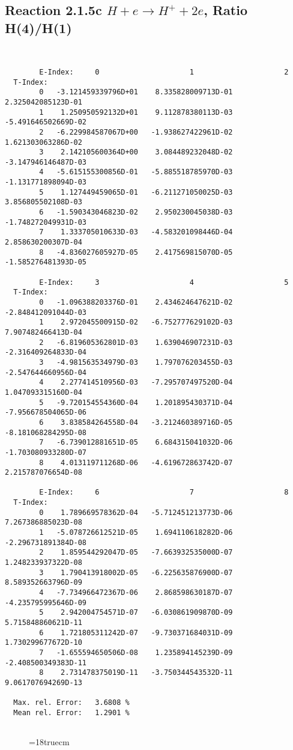 \newpage
\subsection{
Reaction 2.1.5c  $H + e \rightarrow H^+ + 2e$, Ratio H(4)/H(1)
}


\begin{verbatim}


        E-Index:     0                     1                     2
  T-Index:
        0   -3.121459339796D+01    8.335828009713D-01    2.325042085123D-01
        1    1.250950592132D+01    9.112878380113D-03   -5.491646502669D-02
        2   -6.229984587067D+00   -1.938627422961D-02    1.621303063286D-02
        3    2.142105600364D+00    3.084489232048D-02   -3.147946146487D-03
        4   -5.615155300856D-01   -5.885518785970D-03   -1.131771898094D-03
        5    1.127449459065D-01   -6.211271050025D-03    3.856805502108D-03
        6   -1.590343046823D-02    2.950230045038D-03   -1.748272049931D-03
        7    1.333705010633D-03   -4.583201098446D-04    2.858630200307D-04
        8   -4.836027605927D-05    2.417569815070D-05   -1.585276481393D-05

        E-Index:     3                     4                     5
  T-Index:
        0   -1.096388203376D-01    2.434624647621D-02   -2.848412091044D-03
        1    2.972045500915D-02   -6.752777629102D-03    7.907482466413D-04
        2   -6.819605362801D-03    1.639046907231D-03   -2.316409264833D-04
        3   -4.981563534979D-03    1.797076203455D-03   -2.547644660956D-04
        4    2.277414510956D-03   -7.295707497520D-04    1.047093315160D-04
        5   -9.720154554360D-04    1.201895430371D-04   -7.956678504065D-06
        6    3.838584264558D-04   -3.212460389716D-05   -8.181068284295D-08
        7   -6.739012881651D-05    6.684315041032D-06   -1.703080933280D-07
        8    4.013119711268D-06   -4.619672863742D-07    2.215787076654D-08

        E-Index:     6                     7                     8
  T-Index:
        0    1.789669578362D-04   -5.712451213773D-06    7.267386885023D-08
        1   -5.078726612521D-05    1.694110618282D-06   -2.296731891384D-08
        2    1.859544292047D-05   -7.663932535000D-07    1.248233937322D-08
        3    1.790413918002D-05   -6.225635876900D-07    8.589352663796D-09
        4   -7.734966472367D-06    2.868598630187D-07   -4.235795995646D-09
        5    2.942004754571D-07   -6.030861909870D-09    5.715848860621D-11
        6    1.721805311242D-07   -9.730371684031D-09    1.730299677672D-10
        7   -1.655594650506D-08    1.235894145239D-09   -2.408500349383D-11
        8    2.731478375019D-11   -3.750344543532D-11    9.061707694269D-13

  Max. rel. Error:   3.6808 %
  Mean rel. Error:   1.2901 %


\end{verbatim}
\begin{figure} \label{2.1.5c}
\epsfxsize=18truecm
\end{figure}


